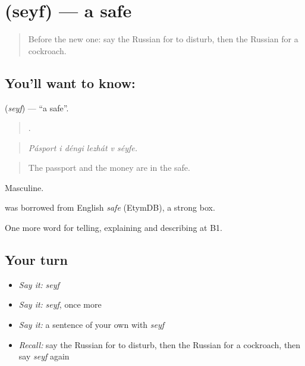 \section[\texorpdfstring{\ru{сейф} (seyf)}{сейф (seyf)}]{ (seyf) — a safe}

\label{lesson:RU-C433-seyf}



\begin{quote}
Before the new one: say the Russian for to disturb, then the Russian for a cockroach.
\end{quote}

\subsection*{You'll want to know: }
\textbf{} (\emph{seyf}) — \textquotedblleft{}a safe\textquotedblright{}.

\begin{quote}
     .
\end{quote}

\begin{quote}
\emph{Pásport i déngi lezhát v séyfe.}
\end{quote}

\begin{quote}
The passport and the money are in the safe.
\end{quote}

Masculine.

\begin{cousinweb}
\emph{} was borrowed from English \emph{safe} (EtymDB), a strong box.
\end{cousinweb}

\begin{grammarlens}[title={What you've built}]
One more word for telling, explaining and describing at B1.
\end{grammarlens}

\subsection*{Your turn}
\begin{itemize}
\raggedright
  \item \emph{Say it:} \emph{seyf}
  \item \emph{Say it:} \emph{seyf}, once more
  \item \emph{Say it:} a sentence of your own with \emph{seyf}
  \item \emph{Recall:} say the Russian for to disturb, then the Russian for a cockroach, then say \emph{seyf} again
\end{itemize}

